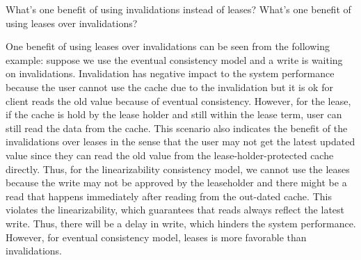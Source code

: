 \begin{QandA}
   \item What's one benefit of using invalidations instead of leases? What's one benefit of using leases over invalidations?
         \begin{answered}
         One benefit of using leases over invalidations can be seen from the following example: suppose we use the eventual consistency model 
         and a write is waiting on invalidations. 
  		 Invalidation has negative impact to the system performance because the user cannot use the cache due to the invalidation but it is ok for client reads the old value because of eventual consistency. However, for the lease, if the cache is hold by the lease holder and still within the lease term, user can still read the data from the cache. This scenario also indicates the benefit of the invalidations over leases in the sense that the user may not get the latest updated value since they can read
       	the old value from the lease-holder-protected cache directly. Thus, for the linearizability consistency model, we cannot use the leases because the write may not be approved by the leaseholder and there might be a read that happens immediately after reading
       	from the out-dated cache. This violates the linearizability, which guarantees that reads always reflect the latest write. 
       	Thus, there will be a delay in write, which hinders the system performance. However, for
       	eventual consistency model, leases is more favorable than invalidations.
         \end{answered}
\end{QandA}